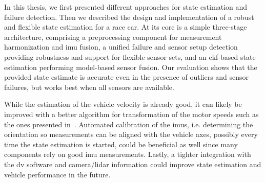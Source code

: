 In this thesis, we first presented different approaches for state estimation and failure detection. Then we described the design and implementation of a robust and flexible state estimation for a race car. At its core is a simple three-stage architecture, comprising a preprocessing component for measurement harmonization and \gls{imu} fusion, a unified failure and sensor setup detection providing robustness and support for flexible sensor sets, and an \gls{ekf}-based state estimation performing model-based sensor fusion. Our evaluation shows that the provided state estimate is accurate even in the presence of outliers and sensor failures, but works best when all sensors are available.

While the estimation of the vehicle velocity is already good, it can likely be improved with a better algorithm for transformation of the motor speeds such as the ones presented in~\cite{Song.2002}. Automated calibration of the \glspl{imu}, i.e. determining the orientation so measurements can be aligned with the vehicle axes, possibly every time the state estimation is started, could be beneficial as well since many components rely on good \gls{imu} measurements. Lastly, a tighter integration with the \gls{dv} software and camera/lidar information could improve state estimation and vehicle performance in the future.
